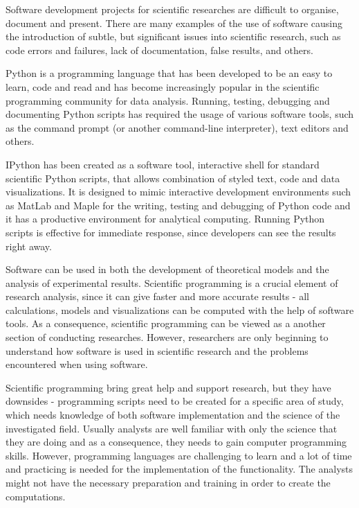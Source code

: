 Software development projects for scientific researches are difficult to organise, document and present. There are many examples of the use of software causing the introduction of subtle, but significant issues into scientific research, such as code errors and failures, lack of documentation, false results, and others. 

Python is a programming language that has been developed to be an easy to learn, code and read and has become increasingly popular in the scientific programming community for data analysis. Running, testing, debugging and documenting Python scripts has required the usage of various software tools, such as the command prompt (or another command-line interpreter), text editors and others. 

IPython has been created as a software tool, interactive shell for standard scientific Python scripts, that allows combination of styled text, code and data visualizations.\cite{mckinney2012python} It is designed to mimic interactive development environments such as MatLab \cite{matLab} and Maple \cite{maple} for  the writing, testing and debugging of Python code and it has a productive environment for analytical computing. \cite{mckinney2012python} Running Python scripts is effective for immediate response, since developers can see the results right away.

Software can be used in both the development of theoretical models and the analysis of experimental results. Scientific programming is a crucial element of research analysis, since it can give faster and more accurate results - all calculations, models and visualizations can be computed with the help of software tools. As a consequence, scientific programming can be viewed as a another section of conducting researches.\cite{johansson2014introduction} However, researchers are only beginning to understand how software is used in scientific research and the problems encountered when using software.

Scientific programming bring great help and support research, but they have downsides - programming scripts need to be created for a specific area of study, which needs knowledge of both software implementation and the science of the investigated field. Usually analysts are well familiar with only the science that they are doing and as a consequence, they needs to gain computer programming skills. However, programming languages are challenging to learn and a lot of time and practicing is needed for the implementation of the functionality. The analysts might not have the necessary preparation and training in order to create the computations.  

